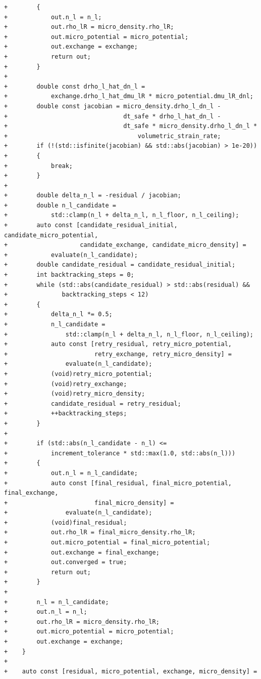 \documentclass[10pt]{article}
\begin{document}
\begin{lstlisting}
+        {
+            out.n_l = n_l;
+            out.rho_lR = micro_density.rho_lR;
+            out.micro_potential = micro_potential;
+            out.exchange = exchange;
+            return out;
+        }
+
+        double const drho_l_hat_dn_l =
+            exchange.drho_l_hat_dmu_lR * micro_potential.dmu_lR_dnl;
+        double const jacobian = micro_density.drho_l_dn_l -
+                                dt_safe * drho_l_hat_dn_l -
+                                dt_safe * micro_density.drho_l_dn_l *
+                                    volumetric_strain_rate;
+        if (!(std::isfinite(jacobian) && std::abs(jacobian) > 1e-20))
+        {
+            break;
+        }
+
+        double delta_n_l = -residual / jacobian;
+        double n_l_candidate =
+            std::clamp(n_l + delta_n_l, n_l_floor, n_l_ceiling);
+        auto const [candidate_residual_initial, candidate_micro_potential,
+                    candidate_exchange, candidate_micro_density] =
+            evaluate(n_l_candidate);
+        double candidate_residual = candidate_residual_initial;
+        int backtracking_steps = 0;
+        while (std::abs(candidate_residual) > std::abs(residual) &&
+               backtracking_steps < 12)
+        {
+            delta_n_l *= 0.5;
+            n_l_candidate =
+                std::clamp(n_l + delta_n_l, n_l_floor, n_l_ceiling);
+            auto const [retry_residual, retry_micro_potential,
+                        retry_exchange, retry_micro_density] =
+                evaluate(n_l_candidate);
+            (void)retry_micro_potential;
+            (void)retry_exchange;
+            (void)retry_micro_density;
+            candidate_residual = retry_residual;
+            ++backtracking_steps;
+        }
+
+        if (std::abs(n_l_candidate - n_l) <=
+            increment_tolerance * std::max(1.0, std::abs(n_l)))
+        {
+            out.n_l = n_l_candidate;
+            auto const [final_residual, final_micro_potential, final_exchange,
+                        final_micro_density] =
+                evaluate(n_l_candidate);
+            (void)final_residual;
+            out.rho_lR = final_micro_density.rho_lR;
+            out.micro_potential = final_micro_potential;
+            out.exchange = final_exchange;
+            out.converged = true;
+            return out;
+        }
+
+        n_l = n_l_candidate;
+        out.n_l = n_l;
+        out.rho_lR = micro_density.rho_lR;
+        out.micro_potential = micro_potential;
+        out.exchange = exchange;
+    }
+
+    auto const [residual, micro_potential, exchange, micro_density] =

\end{lstlisting}
\end{document}
